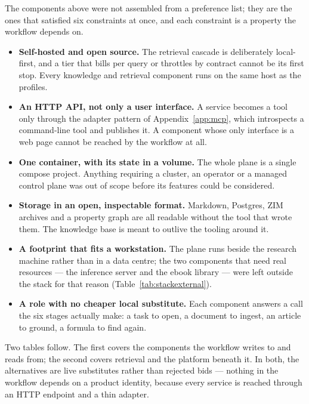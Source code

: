 \documentclass[10pt]{article}
\begin{document}
The components above were not assembled from a preference list; they are the ones that satisfied six
constraints at once, and each constraint is a property the workflow depends on.

\begin{itemize}
    \item \textbf{Self-hosted and open source.} The retrieval cascade is deliberately local-first, and a
    tier that bills per query or throttles by contract cannot be its first stop. Every knowledge and
    retrieval component runs on the same host as the profiles.
    \item \textbf{An HTTP API, not only a user interface.} A service becomes a tool only through the
    adapter pattern of Appendix~\ref{app:mcp}, which introspects a command-line tool and publishes it.
    A component whose only interface is a web page cannot be reached by the workflow at all.
    \item \textbf{One container, with its state in a volume.} The whole plane is a single compose
    project. Anything requiring a cluster, an operator or a managed control plane was out of scope
    before its features could be considered.
    \item \textbf{Storage in an open, inspectable format.} Markdown, Postgres, ZIM archives and a
    property graph are all readable without the tool that wrote them. The knowledge base is meant to
    outlive the tooling around it.
    \item \textbf{A footprint that fits a workstation.} The plane runs beside the research machine
    rather than in a data centre; the two components that need real resources --- the inference server
    and the ebook library --- were left outside the stack for that reason
    (Table~\ref{tab:stackexternal}).
    \item \textbf{A role with no cheaper local substitute.} Each component answers a call the six
    stages actually make: a task to open, a document to ingest, an article to ground, a formula to
    find again.
\end{itemize}

Two tables follow. The first covers the components the workflow writes to and reads from; the second
covers retrieval and the platform beneath it. In both, the alternatives are live substitutes rather
than rejected bids --- nothing in the workflow depends on a product identity, because every service is
reached through an HTTP endpoint and a thin adapter.
\end{document}
